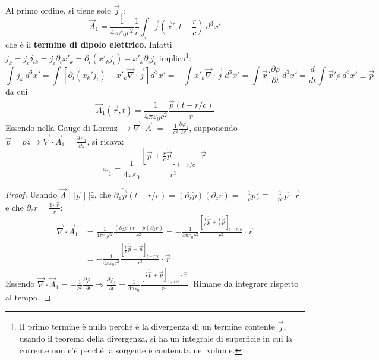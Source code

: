\documentclass[10pt, a4paper]{scrartcl}
\numberwithin{equation}{subsection}
\theoremstyle{style1}
\newenvironment{boxenv}[1][]{
    \begin{eqbox}[#1]
    }{
   \end{eqbox}
}
\begin{document}
Al primo ordine, si tiene solo $\vec{j}_1$:
\begin{equation}
\vec{A}_1 = \frac{1}{4\pi \varepsilon _0 c^2} \frac{1}{r}\int_{\tau } \vec{j}\left(\vec{x}',t-\frac{r}{c}\right)  \ d^3 x'
\end{equation}
che \`e il \textbf{termine di dipolo elettrico}. Infatti $j_k= j_i \delta _{ik} = j_i \partial _i x'_k= \partial _i (x'_k j_i) - x'_k \partial _i j_i$ implica\footnote{Il primo termine \`e nullo perch\'e \`e la divergenza di un termine contente $\vec{j}$, usando il teorema della divergenza, si ha un integrale di superficie in cui la corrente non c'\`e perch\'e la sorgente \`e contenuta nel volume.}:
\[
	\int j_k \ d^3 x' = \int \left[ \partial _i (x_k' j_i) - x'_k \vec{\nabla }\cdot \vec{j}  \right] d^3 x' = -\int x'_k \vec{\nabla }\cdot \vec{j} \ d^3 x' = \int \vec{x}' \frac{\partial \rho }{\partial t} \ d^3 x' = \frac{d }{d t} \int \vec{x}' \rho  \ d^3 x' \equiv \dot{\vec{p}} 
\] 
da cui
\begin{equation}
	 \vec{A}_1(\vec{r},t) = \frac{1}{4\pi \varepsilon _0 c^2}\frac{\dot{\vec{p}}\left(t-r/c\right) }{r}
\end{equation}
Essendo nella Gauge di Lorenz $\to \vec{\nabla }\cdot \vec{A}_1 = -\frac{1}{c^2}\frac{\partial \varphi _1}{\partial t} $, supponendo $\vec{p}=p \hat{z}\Rightarrow \vec{\nabla }\cdot \vec{A}_1 = \frac{\partial A_1}{\partial z} $, si ricava:
\begin{equation}
	\varphi _1 = \frac{1}{4\pi \varepsilon _0}\frac{\left[ \vec{p}+\frac{r}{c}\dot{\vec{p}} \right] _{t - r / c} \cdot \vec{r}}{r^3}
\end{equation}
\begin{boxenv}[]
\begin{proof}
	Usando $\vec{A}  \mid   \mid  \vec{p}  \mid   \mid \hat{z}$, che $\partial _z \dot{\vec{p}}(t - r / c) = (\partial _r \dot{p})(\partial _z r) = -\frac{1}{c}\ddot{p} \frac{z}{r}\equiv -\frac{1}{rc}\ddot{\vec{p}}\cdot \vec{r}$ e che $\partial _z r = \frac{\hat{z}\cdot \vec{r}}{r}$:
	\[
\begin{split}
	\vec{\nabla }\cdot \vec{A}_1 &= \frac{1}{4\pi \varepsilon _0 c^2} \frac{(\partial _z \dot{p})r - \dot{p}(\partial _z r)}{r^2}=-\frac{1}{4\pi \varepsilon _0 c^2}\frac{\left[ \frac{1}{c}\ddot{\vec{p}}+ \frac{1}{r}\dot{\vec{p}}\right]_{t - r / c} }{r^2} \cdot \vec{r}\\
				     &= -\frac{1}{4\pi \varepsilon _0 c^2} \frac{\left[ \frac{r}{c}\ddot{\vec{p}}+ \dot{\vec{p}} \right]_{t- r / c}  }{r^3}\cdot \vec{r}
\end{split}		
	\] 
	Essendo $\vec{\nabla }\cdot \vec{A}_1 = -\frac{1}{c^2}\frac{\partial \varphi _1}{\partial t} \Rightarrow \frac{\partial \varphi _1}{\partial t} = \frac{1}{4\pi \varepsilon _0  } \frac{\left[ \frac{r}{c}\ddot{\vec{p}} + \dot{\vec{p}} \right]_{t - r / c}  \cdot \vec{r}}{r^3}$. Rimane da integrare rispetto al tempo.
\end{proof}
\end{boxenv}
\end{document}
